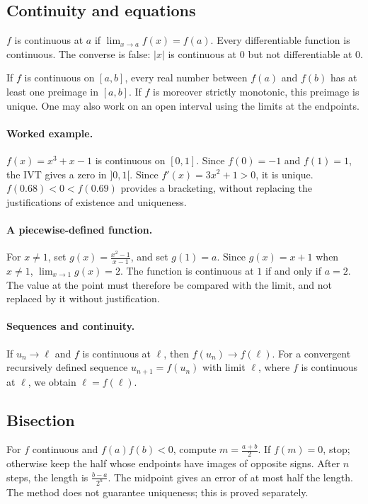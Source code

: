\subsection{Continuity and equations}
$f$ is continuous at $a$ if $\lim_{x\to a}f(x)=f(a)$. Every differentiable function is continuous. The converse is false: $|x|$ is continuous at $0$ but not differentiable at $0$.
\begin{keypoint}
If $f$ is continuous on $[a,b]$, every real number between $f(a)$ and $f(b)$ has at least one preimage in $[a,b]$. If $f$ is moreover strictly monotonic, this preimage is unique. One may also work on an open interval using the limits at the endpoints.
\end{keypoint}
\paragraph{Worked example.} $f(x)=x^3+x-1$ is continuous on $[0,1]$. Since $f(0)=-1$ and $f(1)=1$, the IVT gives a zero in $]0,1[$. Since $f'(x)=3x^2+1>0$, it is unique. $f(\num{0,68})<0<f(\num{0,69})$ provides a bracketing, without replacing the justifications of existence and uniqueness.
\paragraph{A piecewise-defined function.} For $x\ne1$, set $g(x)=\frac{x^2-1}{x-1}$, and set $g(1)=a$. Since $g(x)=x+1$ when $x\ne1$, $\lim_{x\to1}g(x)=2$. The function is continuous at $1$ if and only if $a=2$. The value at the point must therefore be compared with the limit, and not replaced by it without justification.
\paragraph{Sequences and continuity.} If $u_n\to\ell$ and $f$ is continuous at $\ell$, then $f(u_n)\to f(\ell)$. For a convergent recursively defined sequence $u_{n+1}=f(u_n)$ with limit $\ell$, where $f$ is continuous at $\ell$, we obtain $\ell=f(\ell)$.
\subsection{Bisection}
For $f$ continuous and $f(a)f(b)<0$, compute $m=\frac{a+b}{2}$. If $f(m)=0$, stop; otherwise keep the half whose endpoints have images of opposite signs. After $n$ steps, the length is $\frac{b-a}{2^n}$. The midpoint gives an error of at most half the length. The method does not guarantee uniqueness; this is proved separately.


